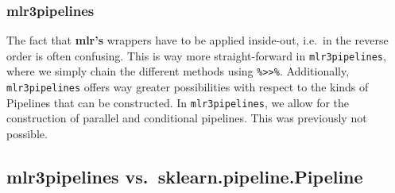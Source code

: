 \documentclass[]{scrbook}
\newenvironment{Shaded}{\begin{snugshade}}{\end{snugshade}}
\newcommand{\CommentTok}[1]{\textcolor[rgb]{0.56,0.35,0.01}{\textit{#1}}}
\newcommand{\DataTypeTok}[1]{\textcolor[rgb]{0.13,0.29,0.53}{#1}}
\newcommand{\KeywordTok}[1]{\textcolor[rgb]{0.13,0.29,0.53}{\textbf{#1}}}
\newcommand{\NormalTok}[1]{#1}
\newcommand{\OperatorTok}[1]{\textcolor[rgb]{0.81,0.36,0.00}{\textbf{#1}}}
\newcommand{\StringTok}[1]{\textcolor[rgb]{0.31,0.60,0.02}{#1}}
\renewenvironment{Shaded} {\begin{snugshade}\small} {\end{snugshade}}
\begin{document}
\hypertarget{mlr3pipelines}{%
\subsubsection{mlr3pipelines}\label{mlr3pipelines}}

\begin{Shaded}
\end{Shaded}

The fact that \textbf{mlr's} wrappers have to be applied inside-out, i.e.~in the reverse order is often confusing.
This is way more straight-forward in \texttt{mlr3pipelines}, where we simply chain the different methods using \texttt{\%\textgreater{}\textgreater{}\%}.
Additionally, \texttt{mlr3pipelines} offers way greater possibilities with respect to the kinds of Pipelines that can be constructed.
In \texttt{mlr3pipelines}, we allow for the construction of parallel and conditional pipelines.
This was previously not possible.

\hypertarget{mlr3pipelines-vs.sklearn.pipeline.pipeline}{%
\subsection{mlr3pipelines vs.~sklearn.pipeline.Pipeline}\label{mlr3pipelines-vs.sklearn.pipeline.pipeline}}
\end{document}

